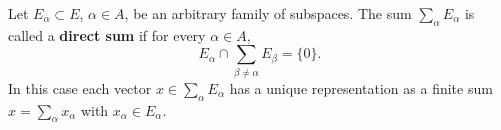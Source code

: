 Let $E_\alpha \subset E$, $\alpha \in A$, be an arbitrary family of subspaces. The sum $\sum_\alpha E_\alpha$ is called a \textbf{direct sum} if for every $\alpha \in A$,
$$E_\alpha \cap \sum_{\beta \neq \alpha} E_\beta = \{0\}.$$
In this case each vector $x \in \sum_\alpha E_\alpha$ has a unique representation as a finite sum $x = \sum_\alpha x_\alpha$ with $x_\alpha \in E_\alpha$.
